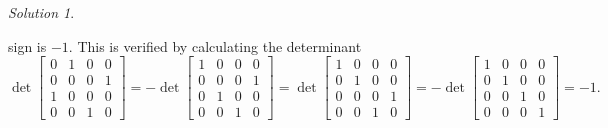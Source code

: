 \documentclass[11pt]{report}
\theoremstyle{remark}
\newtheorem*{solution}{Solution}
\begin{document}
\begin{solution}
\begin{enumerate}
            sign is $-1$. This is verified by calculating the determinant \[
                \det \begin{bmatrix}
                    0 & 1 & 0 & 0 \\
                    0 & 0 & 0 & 1 \\
                    1 & 0 & 0 & 0 \\
                    0 & 0 & 1 & 0 
                \end{bmatrix} = - \det \begin{bmatrix}
                    1 & 0 & 0 & 0 \\
                    0 & 0 & 0 & 1 \\
                    0 & 1 & 0 & 0 \\
                    0 & 0 & 1 & 0 
                \end{bmatrix} = \det \begin{bmatrix}
                    1 & 0 & 0 & 0 \\
                    0 & 1 & 0 & 0 \\
                    0 & 0 & 0 & 1 \\
                    0 & 0 & 1 & 0 
                \end{bmatrix} = -\det \begin{bmatrix}
                    1 & 0 & 0 & 0 \\
                    0 & 1 & 0 & 0 \\
                    0 & 0 & 1 & 0 \\
                    0 & 0 & 0 & 1
                \end{bmatrix} = -1.
            \]
        \end{enumerate}
    \end{solution}
\end{document}
